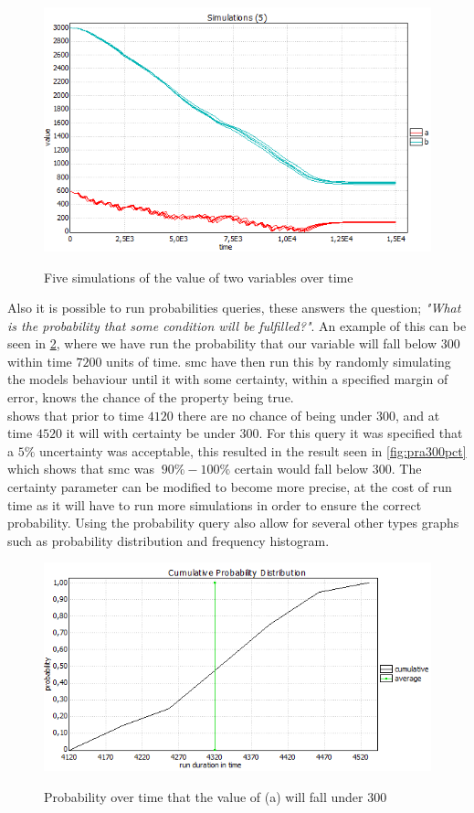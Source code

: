 \begin{figure}[!h]
	\includegraphics[width=\textwidth]{graphics/simab.png}
	\label{fig:simab}
	\caption{Five simulations of the value of two variables  over time}
\end{figure}

Also it is possible to run probabilities queries, these answers the question; \textit{"What is the probability that some condition will be fulfilled?"}. An example of this can be seen in \cref{fig:pra300}, where we have run the probability that our variable  will fall below $300$ within time $7200$ units of time. \Gls{smc} have then run this by randomly simulating the models behaviour until it with some certainty, within a specified margin of error, knows the chance of the property being true.\\
 shows that prior to time $4120$ there are no chance of  being under $300$, and at time $4520$ it will with certainty be under $300$. For this query it was specified that a $5\%$ uncertainty was acceptable, this resulted in the result seen in \cref{fig:pra300pct} which shows that \gls{smc} was $~90\% - 100\%$ certain  would fall below $300$. The certainty parameter can be modified to become more precise, at the cost of run time as it will have to run more simulations in order to ensure the correct probability. Using the probability query also allow  for several other types graphs such as probability distribution and frequency histogram.

\begin{figure}[h]
	\includegraphics[width=\textwidth]{graphics/pra300.png}
	\label{fig:pra300}
	\caption{Probability over time that the value of (a) will fall under 300}
\end{figure}

